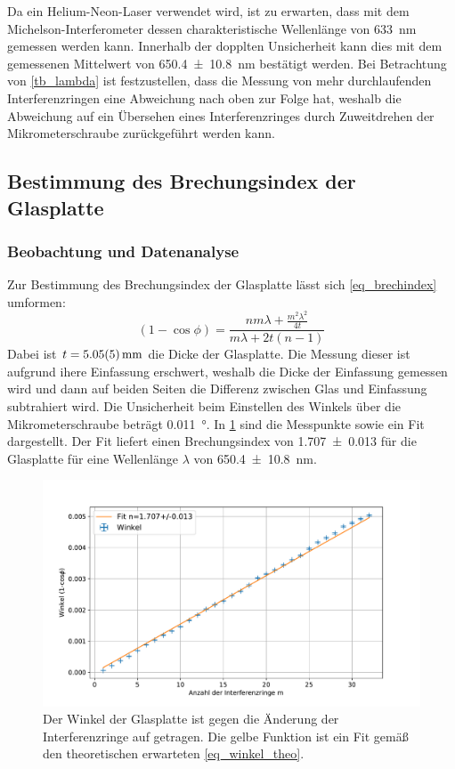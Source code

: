 \documentclass[
	a4paper,
	12pt,
	pagesize,
	ngerman
]{scrartcl}
\begin{document}
	Da ein Helium-Neon-Laser verwendet wird, ist zu erwarten, dass mit dem Michelson-Interferometer dessen charakteristische Wellenlänge von \SI{633}{nm} gemessen werden kann.
	Innerhalb der dopplten Unsicherheit kann dies mit dem gemessenen Mittelwert von \SI{650,4\pm 10,8}{nm} bestätigt werden.
	Bei Betrachtung von \cref{tb_lambda} ist festzustellen, dass die Messung von mehr durchlaufenden Interferenzringen eine Abweichung nach oben zur Folge hat, weshalb die Abweichung auf ein Übersehen eines Interferenzringes durch Zuweitdrehen der Mikrometerschraube zurückgeführt werden kann.

	\subsection{Bestimmung des Brechungsindex der Glasplatte}
	\subsubsection{Beobachtung und Datenanalyse}
	Zur Bestimmung des Brechungsindex der Glasplatte lässt sich \cref{eq_brechindex} umformen:
	\begin{equation}
		(1-\cos{\phi}) = \frac{nm\lambda+\frac{m^2\lambda^2}{4t}}{m\lambda+2t(n-1)}
		\label{eq_winkel_theo}
	\end{equation}
	Dabei ist $t= \SI{5.05+-0.05}{mm}$ die Dicke der Glasplatte.
	Die Messung dieser ist aufgrund ihere Einfassung erschwert, weshalb die Dicke der Einfassung gemessen wird und dann auf beiden Seiten die Differenz zwischen Glas und Einfassung subtrahiert wird.
	Die Unsicherheit beim Einstellen des Winkels über die Mikrometerschraube beträgt \SI{0.011}{\degree}.
	In \cref{fig_glas} sind die Messpunkte sowie ein Fit dargestellt. %
	Der Fit liefert einen Brechungsindex von \SI{1.707+-0.013}{} für die Glasplatte für eine Wellenlänge $\lambda$ von \SI{650.4+-10.8}{nm}. %

\begin{figure}[H]
		\includegraphics[width=\textwidth]{images/Glas.pdf}
		\centering
		\caption{Der Winkel der Glasplatte ist gegen die Änderung der Interferenzringe auf getragen.
		Die gelbe Funktion ist ein Fit gemäß den theoretischen erwarteten \cref{eq_winkel_theo}.}
		\label{fig_glas}
	\end{figure}
\end{document}
